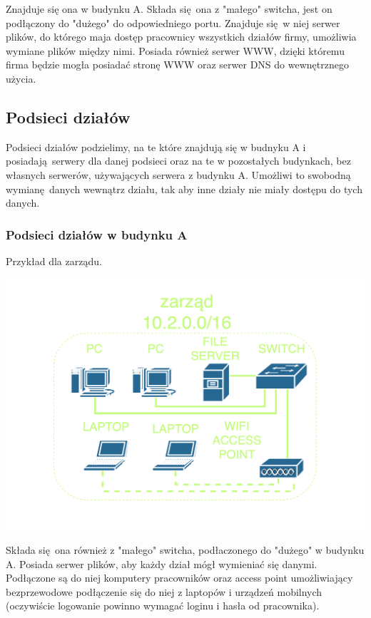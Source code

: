 \documentclass{article}
\begin{document}
      Znajduje się ona w budynku A.
      Składa się ona z "małego" switcha, jest on podłączony do "dużego" do odpowiedniego portu.
      Znajduje się w niej serwer plików, do którego maja dostęp pracownicy wszystkich działów firmy, umożliwia wymiane plików między nimi.
      Posiada również serwer WWW, dzięki któremu firma będzie mogła posiadać stronę WWW oraz serwer DNS do wewnętrznego użycia.

    \subsection{Podsieci działów}
      Podsieci działów podzielimy, na te które znajdują się w budnyku A i posiadają serwery dla danej podsieci oraz na te w pozostałych budynkach, bez własnych serwerów, używających serwera z budynku A. Umożliwi to swobodną wymianę danych wewnątrz działu, tak aby inne działy nie miały dostępu do tych danych.

      \subsubsection{Podsieci działów w budynku A}
        Przykład dla zarządu.

        \centerline{\includegraphics[width=\textwidth,keepaspectratio]{podsiec-zarzad-z-serwerem}}

        Składa się ona również z "małego" switcha, podłaczonego do "dużego" w budynku A.
        Posiada serwer plików, aby każdy dział mógł wymieniać się danymi.
        Podłączone są do niej komputery pracowników oraz access point umożliwiający bezprzewodowe podłączenie się do niej z laptopów i urządzeń mobilnych (oczywiście logowanie powinno wymagać loginu i hasła od pracownika).
\end{document}

